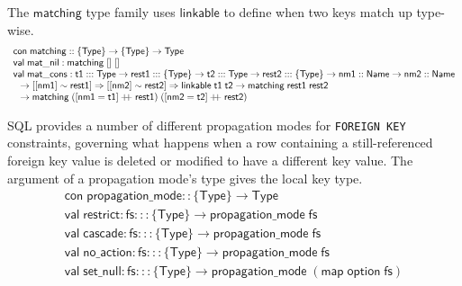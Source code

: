 \documentclass{article}
\newcommand{\mt}[1]{\mathsf{#1}}
\newcommand{\rc}{+ \hspace{-.075in} + \;}
\begin{document}
The $\mt{matching}$ type family uses $\mt{linkable}$ to define when two keys match up type-wise.
$$\begin{array}{l}
  \mt{con} \; \mt{matching} :: \{\mt{Type}\} \to \{\mt{Type}\} \to \mt{Type} \\
  \mt{val} \; \mt{mat\_nil} : \mt{matching} \; [] \; [] \\
  \mt{val} \; \mt{mat\_cons} : \mt{t1} ::: \mt{Type} \to \mt{rest1} ::: \{\mt{Type}\} \to \mt{t2} ::: \mt{Type} \to \mt{rest2} ::: \{\mt{Type}\} \to \mt{nm1} :: \mt{Name} \to \mt{nm2} :: \mt{Name} \\
  \hspace{.1in} \to [[\mt{nm1}] \sim \mt{rest1}] \Rightarrow [[\mt{nm2}] \sim \mt{rest2}] \Rightarrow \mt{linkable} \; \mt{t1} \; \mt{t2} \to \mt{matching} \; \mt{rest1} \; \mt{rest2} \\
  \hspace{.1in} \to \mt{matching} \; ([\mt{nm1} = \mt{t1}] \rc \mt{rest1}) \; ([\mt{nm2} = \mt{t2}] \rc \mt{rest2})
\end{array}$$

SQL provides a number of different propagation modes for \texttt{FOREIGN KEY} constraints, governing what happens when a row containing a still-referenced foreign key value is deleted or modified to have a different key value.  The argument of a propagation mode's type gives the local key type.
$$\begin{array}{l}
  \mt{con} \; \mt{propagation\_mode} :: \{\mt{Type}\} \to \mt{Type} \\
  \mt{val} \; \mt{restrict} : \mt{fs} ::: \{\mt{Type}\} \to \mt{propagation\_mode} \; \mt{fs} \\
  \mt{val} \; \mt{cascade} : \mt{fs} ::: \{\mt{Type}\} \to \mt{propagation\_mode} \; \mt{fs} \\
  \mt{val} \; \mt{no\_action} : \mt{fs} ::: \{\mt{Type}\} \to \mt{propagation\_mode} \; \mt{fs} \\
  \mt{val} \; \mt{set\_null} : \mt{fs} ::: \{\mt{Type}\} \to \mt{propagation\_mode} \; (\mt{map} \; \mt{option} \; \mt{fs})
\end{array}$$
\end{document}
